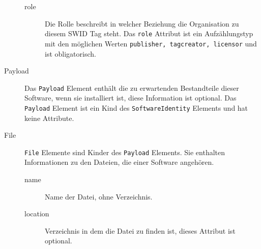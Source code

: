 \begin{description}
\begin{description}
		\item[role] Die Rolle beschreibt in welcher Beziehung die Organisation zu
		diesem SWID Tag steht. Das \texttt{role} Attribut ist ein Aufzählungstyp mit den möglichen Werten \texttt{publisher, tagcreator, licensor} und ist obligatorisch.
	\end{description}
	
	\item[Payload] Das \texttt{Payload} Element enthält die zu erwartenden
	Bestandteile dieser Software, wenn sie installiert ist, diese Information ist
	optional. Das \texttt{Payload} Element ist ein Kind des
	\texttt{SoftwareIdentity} Elements und hat keine Attribute.
	
	\item[File] \texttt{File} Elemente sind Kinder des \texttt{Payload} Elements.
	Sie enthalten Informationen zu den Dateien, die einer Software angehören.
	\begin{description}
		\item[name] Name der Datei, ohne Verzeichnis.
		\item[location] Verzeichnis in dem die Datei zu finden ist, dieses Attribut
		ist optional.
	\end{description}
	
\end{description}

